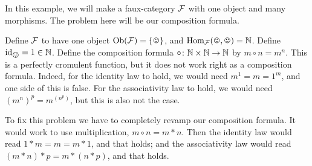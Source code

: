 \documentclass[CT4S-EN-RU]{subfiles}
\begin{document}
\begin{exampleENG}
In this example, we will make a faux-category $\mathcal{F}$ with one object and many morphisms. The problem here will be our composition formula. 

Define $\mathcal{F}$ to have one object $\Ob(\mcF)=\singleton$, and $\Hom_\mcF(\smiley,\smiley)=\NN$. Define $\id_{\smiley}=1\in\NN$. Define the composition formula $\circ\colon{\mathbb N}\times{\mathbb N}\rightarrow{\mathbb N}$ by $m\circ n=m^n$. This is a perfectly cromulent function, but it does not work right as a composition formula. Indeed, for the identity law to hold, we would need $m^1=m=1^m$, and one side of this is false. For the associativity law to hold, we would need $(m^n)^p=m^{(n^p)}$, but this is also not the case.

To fix this problem we have to completely revamp our composition formula. It would work to use multiplication, $m\circ n=m*n$. Then the identity law would read $1*m=m=m*1$, and that holds; and the associativity law would read $(m*n)*p=m*(n*p)$, and that holds.
\end{exampleENG}

\begin{exampleRUS}
\end{exampleRUS}
\end{document}
